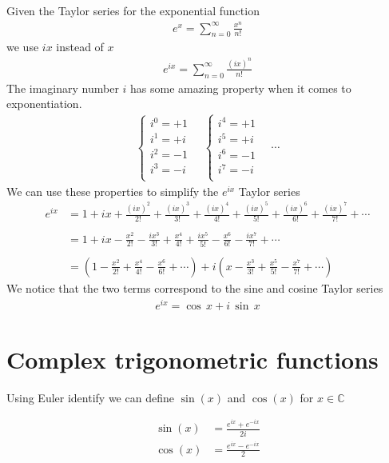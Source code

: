 \documentclass{article}
\begin{document}
Given the Taylor series for the exponential function
\begin{align*}
	e^x=\sum_{n=0}^{\infty}\frac{x^n}{n!}
\end{align*}
we use \(ix\) instead of \(x\)
\begin{align*}
	e^{ix}=\sum_{n=0}^{\infty}\frac{{(ix)}^n}{n!}
\end{align*}
The imaginary number \(i\) has some amazing property when it comes to exponentiation.
\begin{align*}
	\begin{cases}
		i^0=+1\\
		i^1=+i\\
		i^2=-1\\
		i^3=-i\\
	\end{cases}
	\quad
	\begin{cases}
		i^4=+1\\
		i^5=+i\\
		i^6=-1\\
		i^7=-i\\
	\end{cases}
	\quad
	\cdots
\end{align*}
We can use these properties to simplify the \(e^{ix}\) Taylor series
\begin{align*}
	e^{ix}
	&   =1
		+ix
		+\frac{{(ix)}^2}{2!}
		+\frac{{(ix)}^3}{3!}
		+\frac{{(ix)}^4}{4!}
		+\frac{{(ix)}^5}{5!}
		+\frac{{(ix)}^6}{6!}
		+\frac{{(ix)}^7}{7!}
		+\cdots
	\\
	\\
	&   =1
		+ix
		-\frac{x^2}{2!}
		-\frac{ix^3}{3!}
		+\frac{x^4}{4!}
		+\frac{ix^5}{5!}
		-\frac{x^6}{6!}
		-\frac{ix^7}{7!}
		+\cdots
	\\
	\\
	&=
	\left(
		1
		-\frac{x^2}{2!}
		+\frac{x^4}{4!}
		-\frac{x^6}{6!}
		+\cdots
	\right)
	+i
	\left(
		x
		-\frac{x^3}{3!}
		+\frac{x^5}{5!}
		-\frac{x^7}{7!}
		+\cdots
	\right)
\end{align*}
We notice that the two terms correspond to the sine and cosine Taylor series
\begin{align*}
	e^{ix}=\cos\,x+i\,\sin\,x
\end{align*}

\pagebreak

\section{Complex trigonometric functions}

Using Euler identify we can define \(\sin(x)\) and \(\cos(x)\) for \(x \in \mathbb{C}\)

\begin{align*}
	\sin(x)&=\frac{e^{ix}+e^{-ix}}{2i} \\
	\cos(x)&=\frac{e^{ix}-e^{-ix}}{2}
\end{align*}
\end{document}
